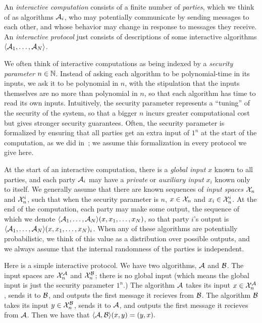 An \emph{interactive computation} consists of a finite number of \emph{parties},
which we think of as algorithms $\mathcal{A}_i$, who may potentially communicate by
sending messages to each other, and whose behavior may change in response to
messages they receive. An \emph{interactive protocol}
just consists of descriptions of some interactive algorithms $\langle\mathcal{A}_1, \dots,
\mathcal{A}_N\rangle$.

We often think of interactive computations as being indexed by a \emph{security
parameter} $n\in\mathbb{N}$. Instead of asking each algorithm to be polynomial-time in
its inputs, we ask it to be polynomial in $n$, with the stipulation that the
inputs themselves are no more than polynomial in $n$, so that each algorithm has
time to read its own inputs. Intuitively, the security parameter represents a
``tuning'' of the security of the system, so that a bigger $n$ incurs greater
computational cost but gives stronger security guarantees. Often, the security
parameter is formalized by ensuring that all parties get an extra input of $1^n$ at
the start of the computation, as we did in~;
we assume this formalization in every protocol we give here.

At the start of an interactive computation, there is a \emph{global input} $x$
known to all parties, and each party $\mathcal{A}_i$ may have a \emph{private} or
\emph{auxiliary input} $x_i$ known only to itself. We generally assume that
there are known sequences of \emph{input spaces} $\mathcal{X}_n$ and $\mathcal{X}^i_n$, such that
when the security parameter is $n$, $x\in \mathcal{X}_n$ and $x_i\in \mathcal{X}^i_n$. At the end of
the computation, each party may make some output, the sequence of which we
denote $\langle\mathcal{A}_1, \dots, \mathcal{A}_N\rangle(x, x_1, \dots, x_N)$, so that party $i$'s output
is $\langle\mathcal{A}_1, \dots, \mathcal{A}_N\rangle(x, x_1, \dots, x_N)_i$. When any of these algorithms
are potentially probabilistic, we think of this value as a distribution over
possible outputs, and we always assume that the internal randomness of the
parties is independent.

\begin{ex}\label{ex:swap}
  Here is a simple interactive protocol. We have two algorithms, $\mathcal{A}$ and
  $\mathcal{B}$. The input spaces are $\mathcal{X}^{\mathcal{A}}_n$ and $\mathcal{X}^{\mathcal{B}}_n$; there is no global
  input (which means the global input is just the security parameter $1^n$.) The
  algorithm $\mathcal{A}$ takes its input $x\in\mathcal{X}^{\mathcal{A}}_n$, sends it to $\mathcal{B}$, and outputs
  the first message it recieves from $\mathcal{B}$. The algorithm $\mathcal{B}$ takes its input
  $y\in\mathcal{X}_n^{\mathcal{B}}$, sends it to $\mathcal{A}$, and outputs the first message it recieves
  from $\mathcal{A}$. Then we have that $
    \langle\mathcal{A},\mathcal{B}\rangle(x,y) = (y,x).
  $
\end{ex}

